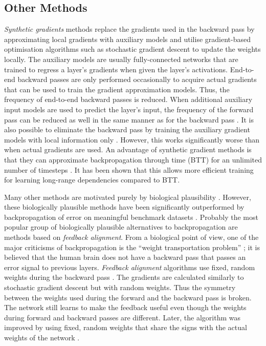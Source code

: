 \subsection{Other Methods}
\emph{Synthetic gradients} methods  replace the gradients used in the backward pass by approximating local gradients with auxiliary models and utilise gradient-based optimisation algorithms such as stochastic gradient descent to update the weights locally.
The auxiliary models are usually fully-connected networks that are trained to regress a layer's gradients when given the layer's activations.
End-to-end backward passes are only performed occasionally to acquire actual gradients that can be used to train the gradient approximation models.
Thus, the frequency of end-to-end backward passes is reduced.
When additional auxiliary input models are used to predict the layer's input, the frequency of the forward pass can be reduced as well in the same manner as for the backward pass \cite{pmlr-v70-jaderberg17a}.
It is also possible to eliminate the backward pass by training the auxiliary gradient models with local information only .
However, this works significantly worse than when actual gradients are used.
An advantage of synthetic gradient methods is that they can approximate backpropagation through time (BTT) for an unlimited number of timesteps \cite{pmlr-v70-jaderberg17a}.
It has been shown that this allows more efficient training for learning long-range dependencies compared to BTT.

Many other methods are motivated purely by biological plausibility .
However, these biologically plausible methods have been significantly outperformed by backpropagation of error on meaningful benchmark datasets .
Probably the most popular group of biologically plausible alternatives to backpropagation are methods based on \emph{feedback alignment}.
From a biological point of view, one of the major criticisms of backpropagation is the ``weight transportation problem'' ; it is believed that the human brain does not have a backward pass that passes an error signal to previous layers.
\emph{Feedback alignment} algorithms use fixed, random weights during the backward pass .
The gradients are calculated similarly to stochastic gradient descent but with random weights.
Thus the symmetry between the weights used during the forward and the backward pass is broken.
The network still learns to make the feedback useful even though the weights during forward and backward passes are different. 
Later, the algorithm was improved by using fixed, random weights that share the signs with the actual weights of the network .

